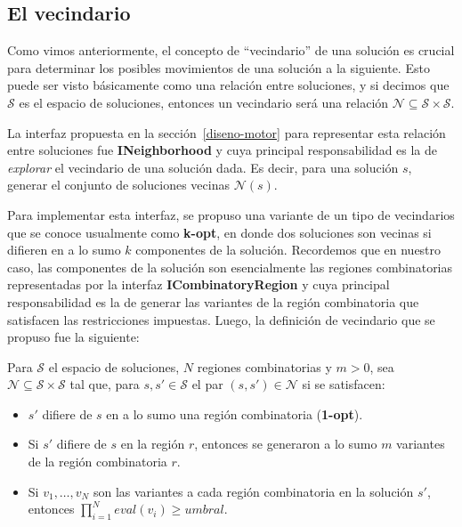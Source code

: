 \subsection{El vecindario}

Como vimos anteriormente, el concepto de ``vecindario'' de una soluci\'on es
crucial para determinar los posibles movimientos de una soluci\'on a la
siguiente. Esto puede ser visto b\'asicamente como una relaci\'on entre
soluciones, y si decimos que $\mathcal{S}$ es el espacio de soluciones, entonces
un vecindario ser\'a una relaci\'on $\mathcal{N} \subseteq \mathcal{S} \times
\mathcal{S}$.

La interfaz propuesta en la secci\'on~\ref{diseno-motor} para representar esta
relaci\'on entre soluciones fue \textbf{INeighborhood} y cuya principal
responsabilidad es la de \textit{explorar} el vecindario de una soluci\'on dada.
Es decir, para una soluci\'on $s$, generar el conjunto de soluciones vecinas
$\mathcal{N}(s)$. 

Para implementar esta interfaz, se propuso una variante de un tipo de
vecindarios que se conoce usualmente como \textbf{k-opt}, en donde dos
soluciones son vecinas si difieren en a lo sumo $k$ componentes de la
soluci\'on. Recordemos que en nuestro caso, las componentes de la soluci\'on son
esencialmente las regiones combinatorias representadas por la interfaz
\textbf{ICombinatoryRegion} y cuya principal responsabilidad es la de generar
las variantes de la regi\'on combinatoria que satisfacen las restricciones
impuestas. Luego, la definici\'on de vecindario que se propuso fue la siguiente:

\begin{definition}
 Para $\mathcal{S}$ el espacio de soluciones, $N$ regiones combinatorias y
$m>0$, sea $\mathcal{N} \subseteq \mathcal{S} \times \mathcal{S}$ tal que,
para $s, s' \in \mathcal{S}$ el par $(s,s') \in \mathcal{N}$ si se satisfacen:
\begin{itemize}
 \item $s'$ difiere de $s$ en a lo sumo una regi\'on combinatoria
(\textbf{1-opt}).
 \item Si $s'$ difiere de $s$ en la regi\'on $r$, entonces se generaron a lo
sumo $m$ variantes de la regi\'on combinatoria $r$.
 \item Si $v_{1}, \dots, v_{N}$ son las variantes a cada regi\'on combinatoria
en la soluci\'on $s'$, entonces $\prod_{i=1}^{N} eval(v_{i}) \ge umbral$.
\end{itemize}
\end{definition}

